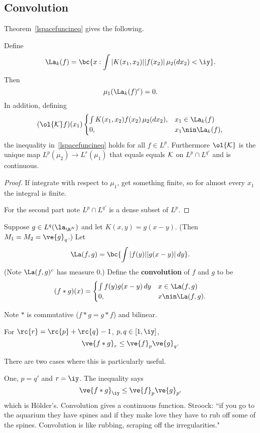 
\subsection{Convolution}
Theorem~\ref{lspacefuncineq} gives the following.
\begin{thm}
Define
\[\La_k(f)=\bc{x:\int |K(x_1,x_2)||f(x_2)|\,\mu_2(dx_2)<\iy}.\]
Then
\[
\mu_1(\La_k(f)^c)=0.
\]
In addition, defining 
\[
(\ol{\cal K}f)(x_1)
\begin{cases}
\int K(x_1,x_2)f(x_2)\,\mu_2(dx_2),&x_1\in \La_k(f)\\
0,&x_1\nin \La_k(f),
\end{cases}
\]
the inequality in~\ref{lspacefuncineq} holds for all $f\in L^p$. Furthermore $\cal \ol{\cal K}$ is the unique map $L^p(\mu_2)\to L^r(\mu_1)$ that equals equals $\cal K$ on $L^p\cap L^{q'}$ and is continuous.
\end{thm}
\begin{proof}
If integrate with respect to $\mu_1$, get something finite, so for almost every $x_1$ the integral is finite.

For the second part note $L^p\cap L^{q'}$ is a dense subset of $L^p$.
\end{proof}
\begin{df}
Suppose $g\in L^q(\la_{\R^N})$ and let $K(x,y)=g(x-y)$. (Then $M_1=M_2=\ve{g}_q$.) %
Let
\[
\La(f,g)=\bc{
\int|f(y)||g(x-y)|\,dy
}.
\]
(Note $\La(f,g)^c$ has measure 0.) Define the {\textbf{convolution}} of $f$ and $g$ to be
\[
(f* g)(x)=\begin{cases}
\int f(y)g(x-y)\,dy&x\in \La(f,g)\\
0,&x\nin\La(f,g).
\end{cases}
\]
\end{df}
Note $*$ is commutative ($f*g=g*f$) and bilinear.
\begin{thm}
For $\rc{r}=\rc{p}+\rc{q}-1$, $p,q\in [1,\iy]$,
\[
\ve{f*g}_r\le \ve{f}_p\ve{g}_q.
\]
\end{thm}
There are two cases where this is particularly useful.

One, $p=q'$ and $r=\iy$. The inequality says
\[
\ve{f*g}_{\iy}\le \ve{f}_p\ve{g}_{p'}
\]
which is H\"older's. %
Convolution gives a continuous function. Stroock: ``if you go to the aquarium they have spines and if they make love they have to rub off some of the spines. Convolution is like rubbing, scraping off the irregularities."

